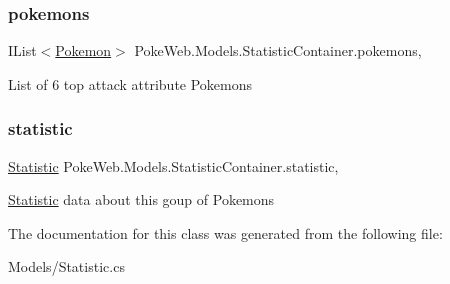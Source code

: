 \subsubsection{\texorpdfstring{pokemons}{pokemons}}
{\footnotesize\ttfamily I\+List$<$\mbox{\hyperlink{class_poke_web_1_1_models_1_1_pokemon}{Pokemon}}$>$ Poke\+Web.\+Models.\+Statistic\+Container.\+pokemons\hspace{0.3cm}{\ttfamily [get]}, {\ttfamily [set]}}

List of 6 top attack attribute Pokemons \mbox{\label{class_poke_web_1_1_models_1_1_statistic_container_a4d3cb3c4061cd7077870bcd1675aaff6}} 
\subsubsection{\texorpdfstring{statistic}{statistic}}
{\footnotesize\ttfamily \mbox{\hyperlink{class_poke_web_1_1_models_1_1_statistic}{Statistic}} Poke\+Web.\+Models.\+Statistic\+Container.\+statistic\hspace{0.3cm}{\ttfamily [get]}, {\ttfamily [set]}}

\mbox{\hyperlink{class_poke_web_1_1_models_1_1_statistic}{Statistic}} data about this goup of Pokemons 

The documentation for this class was generated from the following file\+:\begin{DoxyCompactItemize}
\item 
Models/Statistic.\+cs\end{DoxyCompactItemize}
